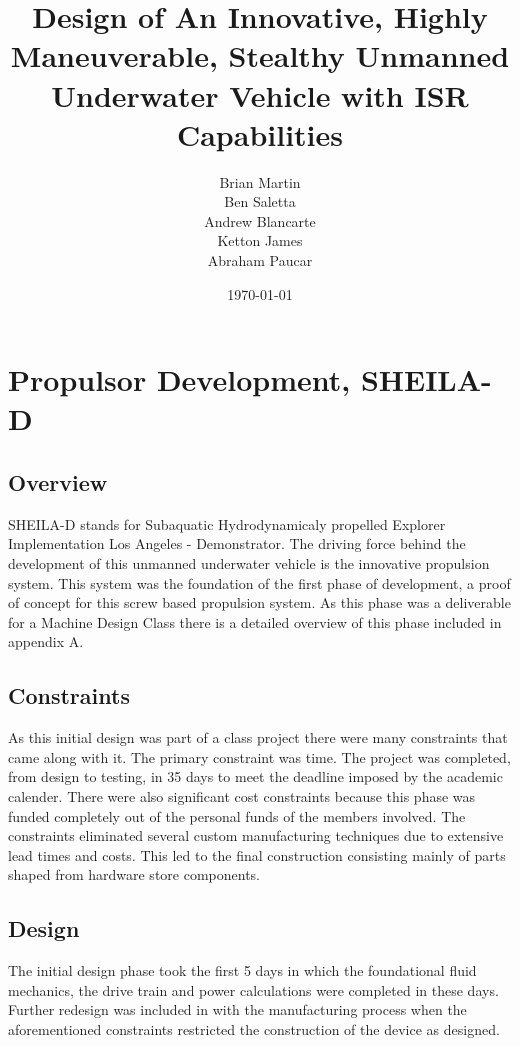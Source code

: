 \documentclass{report}
\title{Design of An Innovative, Highly Maneuverable, Stealthy Unmanned Underwater Vehicle with ISR Capabilities }
\author{Brian Martin\\ Ben Saletta\\Andrew Blancarte\\ Ketton James\\Abraham Paucar}
\date{\today}
\begin{document}
\maketitle
\tableofcontents
\listoffigures
\chapter{Propulsor Development, SHEILA-D}
\section{Overview}
SHEILA-D stands for Subaquatic Hydrodynamicaly propelled Explorer Implementation Los Angeles - Demonstrator. The driving force behind the development of this unmanned underwater vehicle is the innovative propulsion system. This system was the foundation of the first phase of development, a proof of concept for this screw based propulsion system. As this phase was a deliverable for a Machine Design Class there is a detailed overview of this phase included in appendix A. 
\section{Constraints}
As this initial design was part of a class project there were many constraints that came along with it. The primary constraint was time. The project was completed, from design to testing, in 35 days to meet the deadline imposed by the academic calender. There were also significant cost constraints because this phase was funded completely out of the personal funds of the members involved. The constraints eliminated several custom manufacturing techniques due to extensive lead times and costs. This led to the final construction consisting mainly of parts shaped from hardware store components.
\section{Design}
The initial design phase took the first 5 days in which the foundational fluid mechanics, the drive train and power calculations were completed in these days. Further redesign was included in with the manufacturing process when the aforementioned constraints restricted the construction of the device as designed.
\end{document}
